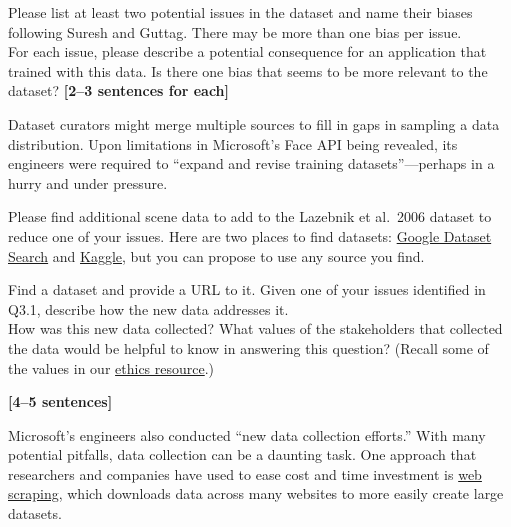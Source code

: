 \documentclass{csci1430}
\begin{document}
\pagebreak
\begin{subquestion}[points=4]
Please list at least two potential issues in the dataset and name their biases following Suresh and Guttag. There may be more than one bias per issue. \\

For each issue, please describe a potential consequence for an application that trained with this data. Is there one bias that seems to be more relevant to the dataset? \textbf{[2--3 sentences for each]}
\end{subquestion}

\begin{answer}[height=20]

\end{answer}

\pagebreak
Dataset curators might merge multiple sources to fill in gaps in sampling a data distribution. Upon limitations in Microsoft's Face API being revealed, its engineers were required to ``expand and revise training datasets''---perhaps in a hurry and under pressure. 

Please find additional scene data to add to the Lazebnik et al.~2006 dataset to reduce one of your issues. Here are two places to find datasets: \href{https://datasetsearch.research.google.com}{Google Dataset Search} and \href{https://www.kaggle.com}{Kaggle}, but you can propose to use any source you find.

\begin{subquestion}[points=4]
Find a dataset and provide a URL to it. Given one of your issues identified in Q3.1, describe how the new data addresses it. \\

How was this new data collected?
What values of the stakeholders that collected the data would be helpful to know in answering this question?
(Recall some of the values in our \href{https://browncsci1430.github.io/resources/ethics_primer/}{ethics resource}.)

\textbf{[4--5 sentences]}
\end{subquestion}

\begin{answer}[height=20]

\end{answer}

\pagebreak
Microsoft's engineers also conducted ``new data collection efforts.'' With many potential pitfalls, data collection can be a daunting task.
One approach that researchers and companies have used to ease cost and time investment is 
\href{https://en.wikipedia.org/wiki/Web_scraping#}{web scraping}, which downloads data across many websites to more easily create large datasets. 
\end{document}
